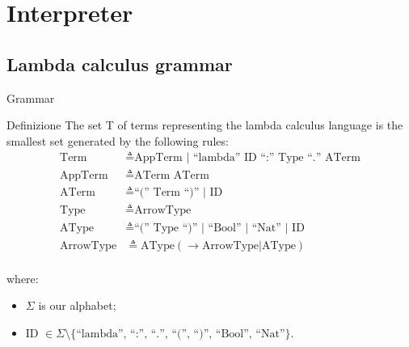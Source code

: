 \documentclass[8pt]{beamer}
\begin{document}
\section{Interpreter}

\subsection{Lambda calculus grammar}

\begin{frame}{Grammar}
  \begin{block}{Definizione}
    The set T of terms representing the lambda calculus language is the
    smallest set generated by the following rules:
  \begin{displaymath}
    \begin{split}
      \text{Term} &\triangleq \text{AppTerm | ``lambda'' ID ``:'' Type ``.''
        ATerm}\\
      \text{AppTerm} &\triangleq \text{ATerm ATerm} \\
      \text{ATerm} &\triangleq \text{``('' Term ``)'' | ID}\\
      \text{Type} &\triangleq \text{ArrowType}\\
      \text{AType} &\triangleq \text{``('' Type ``)'' | ``Bool'' |
        ``Nat'' | ID}\\
      \text{ArrowType} &\triangleq \text{AType} (\rightarrow
      \text{ArrowType} | \text{AType})\\
    \end{split}
  \end{displaymath}
\end{block}
where:
\begin{itemize}
    \item $\Sigma$ is our alphabet;
    \item ID $\in \Sigma \setminus \{ \text{``lambda'', ``:'', ``.'',
  ``('', ``)'', ``Bool'', ``Nat''} \}$.
\end{itemize}

\end{frame}
\end{document}
